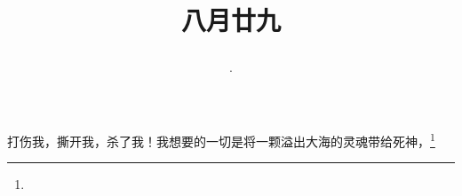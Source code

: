 \title{\date[d=1,m=10,y=2024][year:cn-y,年,month:cn,day:cn,日,·,weekday]·八月廿九 }
打伤我，撕开我，杀了我！我想要的一切是将一颗溢出大海的灵魂带给死神，\footnote{ }

